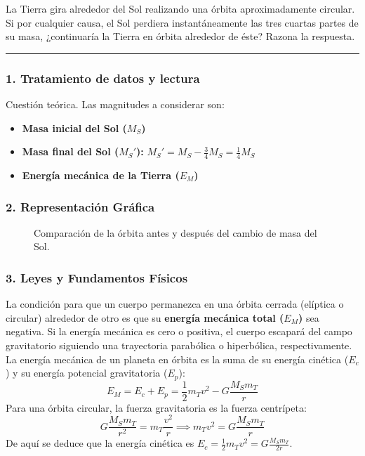 \begin{cajaenunciado}
La Tierra gira alrededor del Sol realizando una órbita aproximadamente circular. Si por cualquier causa, el Sol perdiera instantáneamente las tres cuartas partes de su masa, ¿continuaría la Tierra en órbita alrededor de éste? Razona la respuesta.
\end{cajaenunciado}
\hrule

\subsubsection*{1. Tratamiento de datos y lectura}
Cuestión teórica. Las magnitudes a considerar son:
\begin{itemize}
    \item \textbf{Masa inicial del Sol ($M_S$)}
    \item \textbf{Masa final del Sol ($M_S'$):} $M_S' = M_S - \frac{3}{4}M_S = \frac{1}{4}M_S$
    \item \textbf{Energía mecánica de la Tierra ($E_M$)}
\end{itemize}

\subsubsection*{2. Representación Gráfica}
\begin{figure}[H]
    \centering
    \caption{Comparación de la órbita antes y después del cambio de masa del Sol.}
\end{figure}

\subsubsection*{3. Leyes y Fundamentos Físicos}
La condición para que un cuerpo permanezca en una órbita cerrada (elíptica o circular) alrededor de otro es que su \textbf{energía mecánica total ($E_M$)} sea negativa. Si la energía mecánica es cero o positiva, el cuerpo escapará del campo gravitatorio siguiendo una trayectoria parabólica o hiperbólica, respectivamente.
La energía mecánica de un planeta en órbita es la suma de su energía cinética ($E_c$) y su energía potencial gravitatoria ($E_p$):
$$E_M = E_c + E_p = \frac{1}{2}m_T v^2 - G \frac{M_S m_T}{r}$$
Para una órbita circular, la fuerza gravitatoria es la fuerza centrípeta:
$$G \frac{M_S m_T}{r^2} = m_T \frac{v^2}{r} \implies m_T v^2 = G \frac{M_S m_T}{r}$$
De aquí se deduce que la energía cinética es $E_c = \frac{1}{2} m_T v^2 = G \frac{M_S m_T}{2r}$.

